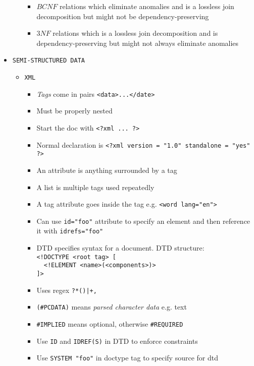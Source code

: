 \documentclass[landscape,8pt]{extarticle}
\newcommand{\code}{\lstinline}
\begin{document}
\begin{multicols}{4}
\begin{itemize}
\begin{itemize}
        \begin{itemize}
            \item $BCNF$ relations which eliminate anomalies and is a lossless join decomposition
            but might not be dependency-preserving
            \item $3NF$ relations which is a lossless join decomposition and is
            dependency-preserving but might not always eliminate anomalies
        \end{itemize}
    \end{itemize}
    \item \code{SEMI-STRUCTURED DATA}
    \begin{itemize}
        \item \code{XML}
        \begin{itemize}
            \item \emph{Tags} come in pairs \code{<data>...</date>}
            \item Must be properly nested
            \item Start the doc with \code{<?xml ... ?>}
            \item Normal declaration is \code{<?xml version = "1.0" standalone = "yes" ?>}
            \item An attribute is anything surrounded by a tag
            \item A list is multiple tags used repeatedly
            \item A tag attribute goes inside the tag e.g. \code{<word lang="en">}
            \item Can use \code{id="foo"} attribute to specify an element and then reference it with
            \code{idrefs="foo"}
            \item DTD specifies syntax for a document. DTD structure:\\
\code{<!DOCTYPE <root tag> [}\\
\code{  <!ELEMENT <name>(<components>)>}\\
\code{]>}
            \item Uses regex \code{?*()|+,}
            \item \code{(#PCDATA)} means \emph{parsed character data} e.g. text
            \item \code{#IMPLIED} means optional, otherwise \code{#REQUIRED}
            \item Use \code{ID} and \code{IDREF(S)} in DTD to enforce constraints
            \item Use \code{SYSTEM "foo"} in doctype tag to specify source for dtd

\end{itemize}
\end{itemize}
\end{itemize}
\end{multicols}
\end{document}
